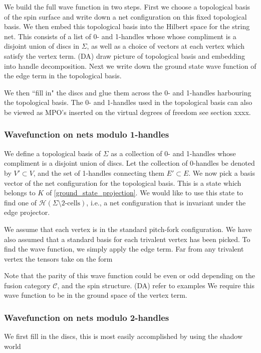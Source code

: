 \documentclass[12pt,a4paper]{article}
\newcommand{\mch}{\mathcal{H}}
\newcommand{\mcc}{\mathcal{C}}
\newcommand{\dave}[1]{{\color{ao(english)}\footnotesize{(DA) #1}}}
\begin{document}
We build the full wave function in two steps. 
First we choose a topological basis of the spin surface 
and write down a net configuration on this fixed topological basis. 
We then embed this topological basis into the Hilbert space for the string net. 
This consists of a list of 0- and 1-handles whose whose compliment is a disjoint union of discs in $\Sigma$, as well as a choice of vectors at each vertex which satisfy the vertex term.
\dave{draw picture of topological basis and embedding into handle decomposition.}
Next we write down the ground state wave function of the edge term in the topological basis. 

We then ``fill in" the discs and glue them across the 0- and 1-handles harbouring the topological basis. 
The 0- and 1-handles used in the topological basis can also be viewed as MPO's inserted on the virtual degrees of freedom see section xxxx. 

\subsubsection{Wavefunction on nets modulo 1-handles}
We define a topological basis of $\Sigma$ as a collection of 
0- and 1-handles whose compliment is a disjoint union of discs.
Let the collection of 0-handles be denoted by $V' \subset V$, and the set of 1-handles connecting them $E'\subset E$.
We now pick a basis vector of the net configuration for the topological basis.
This is a state which belongs to $K$ of \eqref{ground_state_projection}. 
We would like to use this state to find one of $\mch(\Sigma \setminus \mbox{2-cells})$, i.e., a net configuration that is invariant under the edge projector.

We assume that each vertex is in the standard pitch-fork configuration.
We have also assumed that a standard basis for each trivalent vertex has been picked.
To find the wave function, we simply apply the edge term. 
Far from any trivalent vertex the tensors take on the form 

Note that the parity of this wave function could be even or odd depending on the fusion category $\mcc$,
and the spin structure. 
\dave{refer to examples}
We require this wave function to be in the ground space of the vertex term.



\subsubsection{Wavefunction on nets modulo 2-handles}
We first fill in the discs, this is most easily accomplished by using the shadow world
\end{document}

